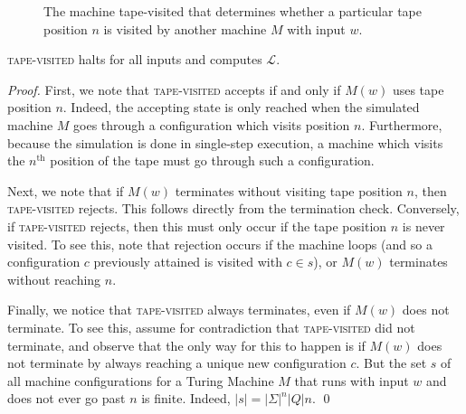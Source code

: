 \documentclass[11pt]{llncs}
\begin{document}
\begin{figure}[t]
\begin{algorithm}[H]
  \caption{\label{alg.7}
      The machine \textsf{tape-visited} that determines whether a particular
      tape position $n$ is visited by another machine $M$ with input $w$.
  }
  \begin{algorithmic}[1]
                  \State{}
              \EndIf
                  \State{}
              \EndIf
                  \State{}
              \EndIf
          \EndWhile
      \EndFunction
  \end{algorithmic}
\end{algorithm}
\end{figure}

\begin{lemma}
\textsc{tape-visited} halts for all inputs and computes $\mathcal{L}$.
\end{lemma}
\begin{proof}
First, we note that \textsc{tape-visited} accepts if and only if $M(w)$ uses
tape position $n$. Indeed, the accepting state is only reached when the
simulated machine $M$ goes through a configuration which visits position $n$.
Furthermore, because the simulation is done in single-step execution, a machine
which visits the $n^{\text{th}}$ position of the tape must go through such a
configuration.

Next, we note that if $M(w)$ terminates without visiting tape position $n$, then
\textsc{tape-visited} rejects. This follows directly from the termination check.
Conversely, if \textsc{tape-visited} rejects, then this must only occur if the
tape position $n$ is never visited. To see this, note that rejection occurs if
the machine loops (and so a configuration $c$ previously attained is visited
with $c \in s$), or $M(w)$ terminates without reaching $n$.

Finally, we notice that \textsc{tape-visited} always terminates, even if $M(w)$
does not terminate. To see this, assume for contradiction that
\textsc{tape-visited} did not terminate, and observe that the only way for
this to happen is if $M(w)$ does not terminate by always reaching a unique new
configuration $c$. But the set $s$ of all machine configurations for a Turing
Machine $M$ that runs with input $w$ and does not ever go past $n$ is finite.
Indeed, $|s| = |\Sigma|^n |Q| n$.
\qed
\end{proof}
\end{document}
